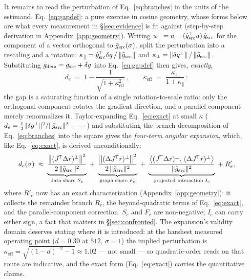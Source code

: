 It remains to read the perturbation of Eq.~\ref{eq:branches} in the
units of the estimand, Eq.~\ref{eq:gapdef}: a pure exercise in
cosine geometry, whose forms below are what every measurement in
\S\ref{sec:evidence} is fit against (step-by-step derivation in
Appendix~\ref{app:geometry}). Writing
$u^{\perp} = u - (\hat g_{\mathrm{src}}^{\!\top}u)\,\hat g_{\mathrm{src}}$ for the
component of a vector orthogonal to $\bar g_{\mathrm{src}}(\sigma)$, split the
perturbation into a rescaling and a rotation:
$\kappa_\parallel = \hat g_{\mathrm{src}}^{\!\top}\delta g \,/\, \|\bar g_{\mathrm{src}}\|$
and $\kappa_\perp = \|\delta g^{\perp}\| \,/\, \|\bar g_{\mathrm{src}}\|$. Substituting
$\bar g_{\mathrm{dem}} = \bar g_{\mathrm{src}} + \delta g$ into
Eq.~\ref{eq:gapdef} then gives, \emph{exactly},
\begin{equation}
d_e \;=\; 1 - \frac{1}{\sqrt{1 + \kappa_{\mathrm{eff}}^2}}\,,
\qquad
\kappa_{\mathrm{eff}} \;=\; \frac{\kappa_\perp}{1 + \kappa_\parallel}\,:
\label{eq:exact}
\end{equation}
the gap is a saturating function of a single rotation-to-scale ratio:
only the orthogonal component rotates the gradient direction, and
a parallel component merely renormalizes it. Taylor-expanding
Eq.~\ref{eq:exact} at small $\kappa$
($d_e = \tfrac{1}{2}\|\delta g^{\perp}\|^2/\|\bar g_{\mathrm{src}}\|^2 + \cdots$) and
substituting the branch decomposition of Eq.~\ref{eq:branches} into
the square
gives the \emph{four-term angular expansion}, which, like
Eq.~\ref{eq:exact}, is derived unconditionally:
\begin{equation}
d_e(\sigma) \;\approx\;
\underbrace{\frac{\big\|(J^{\!\top}\Delta\bar r)^{\perp}\big\|^2}{2\,\|\bar g_{\mathrm{src}}\|^2}}_{\text{data share }S_e}
\;+\;
\underbrace{\frac{\big\|(\Delta J^{\!\top}\bar r)^{\perp}\big\|^2}{2\,\|\bar g_{\mathrm{src}}\|^2}}_{\text{graph share }F_e}
\;+\;
\underbrace{\frac{\big\langle (J^{\!\top}\Delta\bar r)^{\perp},\, (\Delta J^{\!\top}\bar r)^{\perp}\big\rangle}{\|\bar g_{\mathrm{src}}\|^2}}_{\text{projected interaction }I_e}
\;+\; R'_e,
\label{eq:fourterm}
\end{equation}
where $R'_e$ now has an exact characterization
(Appendix~\ref{app:geometry}): it collects the remainder branch $R_e$,
the beyond-quadratic terms of Eq.~\ref{eq:exact}, and the
parallel-component correction. $S_e$ and $F_e$ are non-negative; $I_e$
can carry either sign, a fact that matters in
\S\ref{sec:confronted}. The expansion's validity domain deserves
stating where it is introduced: at the harshest measured operating
point ($d = 0.30$ at $512$, $\sigma{=}1$) the implied perturbation is
$\kappa_{\mathrm{eff}} = \sqrt{(1-d)^{-2} - 1} \approx 1.02$ --- not
small --- so quadratic-order reads on that route are indicative, and
the exact form (Eq.~\ref{eq:exact}) carries the quantitative claims.

